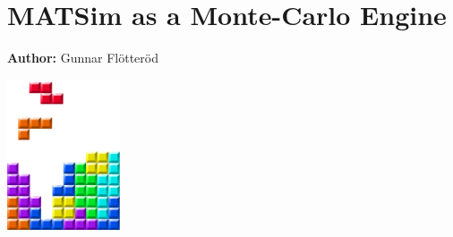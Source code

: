 \chapter{MATSim as a Monte-Carlo Engine }
\label{ch:montecarlo}

\hfill \textbf{Author:} Gunnar Flötteröd

\begin{center} \includegraphics[width=0.25\textwidth, angle=0]{figures/MATSimBook.png} \end{center}


\citet[][]{Floetteroed_unpub_MCM_2012}

